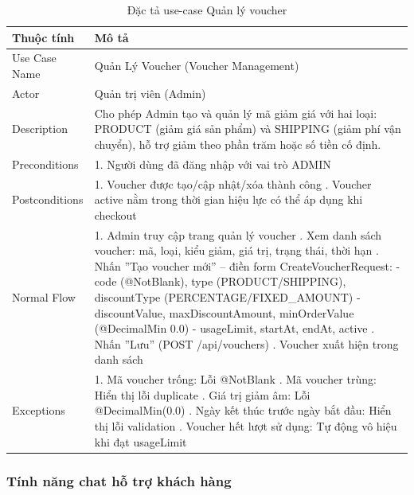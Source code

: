 \begin{table}[H]
\centering
\begin{tabular}{|l|p{11cm}|}
\hline
\textbf{Thuộc tính} & \textbf{Mô tả} \\
\hline
Use Case Name & Quản Lý Voucher (Voucher Management) \\
\hline
Actor & Quản trị viên (Admin) \\
\hline
Description & Cho phép Admin tạo và quản lý mã giảm giá với hai loại: PRODUCT (giảm giá sản phẩm) và SHIPPING (giảm phí vận chuyển), hỗ trợ giảm theo phần trăm hoặc số tiền cố định. \\
\hline
Preconditions & 1. Người dùng đã đăng nhập với vai trò ADMIN \\
\hline
Postconditions & 1. Voucher được tạo/cập nhật/xóa thành công \newline 2. Voucher active nằm trong thời gian hiệu lực có thể áp dụng khi checkout \\
\hline
Normal Flow & 1. Admin truy cập trang quản lý voucher \newline 2. Xem danh sách voucher: mã, loại, kiểu giảm, giá trị, trạng thái, thời hạn \newline 3. Nhấn ''Tạo voucher mới'' -- điền form CreateVoucherRequest: \newline \quad - code (@NotBlank), type (PRODUCT/SHIPPING), discountType (PERCENTAGE/FIXED\_AMOUNT) \newline \quad - discountValue, maxDiscountAmount, minOrderValue (@DecimalMin 0.0) \newline \quad - usageLimit, startAt, endAt, active \newline 4. Nhấn ''Lưu'' (POST /api/vouchers) \newline 5. Voucher xuất hiện trong danh sách \\
\hline
Exceptions & 1. Mã voucher trống: Lỗi @NotBlank \newline 2. Mã voucher trùng: Hiển thị lỗi duplicate \newline 3. Giá trị giảm âm: Lỗi @DecimalMin(0.0) \newline 4. Ngày kết thúc trước ngày bắt đầu: Hiển thị lỗi validation \newline 5. Voucher hết lượt sử dụng: Tự động vô hiệu khi đạt usageLimit \\
\hline
\end{tabular}
\caption{Đặc tả use-case Quản lý voucher}
\label{tab:uc016}
\end{table}

\subsubsection{Tính năng chat hỗ trợ khách hàng}

